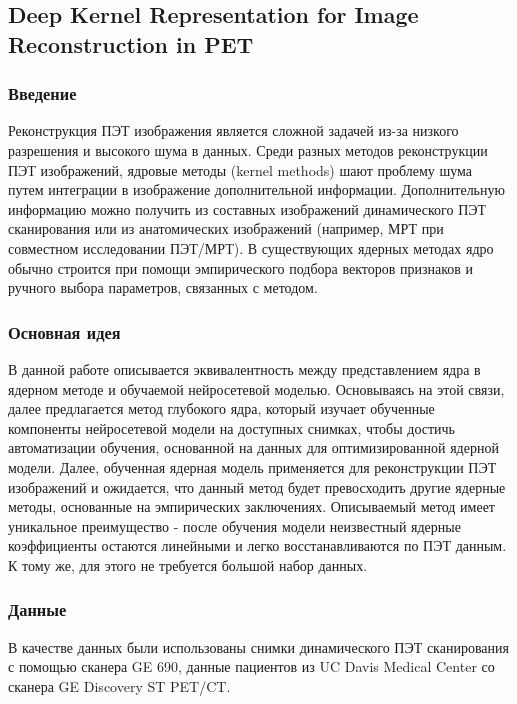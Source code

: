 \subsection*{Deep Kernel Representation for Image Reconstruction in PET}

\subsubsection*{Введение} 
Реконструкция ПЭТ изображения является сложной задачей из-за низкого разрешения и высокого шума в данных. 
Среди разных методов реконструкции ПЭТ изображений, ядровые методы (kernel methods) шают проблему шума 
путем интеграции в изображение дополнительной информации. Дополнительную информацию можно получить из 
составных изображений динамического ПЭТ сканирования или из анатомических изображений (например, МРТ при совместном исследовании ПЭТ/МРТ). 
В существующих ядерных методах ядро обычно строится при помощи эмпирического подбора векторов признаков и ручного выбора параметров, связанных с методом. \par
\subsubsection*{Основная идея}
В данной работе \cite{ann5} описывается эквивалентность между представлением ядра в ядерном методе и 
обучаемой нейросетевой моделью. Основываясь на этой связи, далее предлагается метод \glqq глубокого ядра\grqq, 
который изучает обученные компоненты нейросетевой модели на доступных снимках, чтобы достичь автоматизации обучения, 
основанной на данных для оптимизированной ядерной модели. Далее, обученная ядерная модель применяется для реконструкции 
ПЭТ изображений и ожидается, что данный метод будет превосходить другие ядерные методы, основанные на эмпирических заключениях. 
Описываемый метод имеет уникальное преимущество - после обучения модели неизвестный ядерные коэффициенты остаются линейными и 
легко восстанавливаются по ПЭТ данным. К тому же, для этого не требуется большой набор данных. \par
\subsubsection*{Данные}
В качестве данных были использованы снимки динамического ПЭТ сканирования с помощью сканера GE 690, 
данные пациентов из UC Davis Medical Center со сканера GE Discovery ST PET/CT. \par
